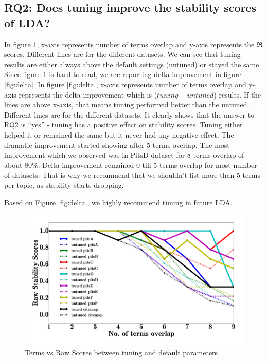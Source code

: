 \documentclass[10pt,conference]{IEEEtran}
\theoremstyle{break}
\begin{document}
\subsection{\textbf{RQ2: Does tuning improve the stability scores of LDA?}}

In figure \ref{fig:raw}, x-axis represents number of terms overlap and y-axis represents the $\Re$ scores. Different lines are for the different datasets. We can see that tuning results are either always above the default settings (untuned) or stayed the same. Since figure \ref{fig:raw} is hard to read, we are reporting delta improvement in figure \ref{fig:delta}. In figure \ref{fig:delta}, x-axis represents number of terms overlap and y-axis represents the delta improvement which is ($tuning - untuned$) results. If the lines are above x-axis, that means tuning performed better than the untuned. Different lines are for the different datasets. It clearly shows that the answer to RQ2 is “yes” - tuning has a positive effect on stability scores. Tuning either helped it or remained the same but it never had any negative effect. The dramatic improvement started showing after 5 terms overlap. The most improvement which we observed was in PitsD dataset for 8 terms overlap of about 80\%. Delta improvement remained 0 till 5 terms overlap for most number of datasets. That is why we recommend that we shouldn't list more than 5 terms per topic, as stability starts dropping.

\begin{lesson}
Based on Figure \ref{fig:delta}, we highly recommend tuning in future LDA.
\end{lesson}

\begin{center}
\begin{figure}[!htbp]
  \includegraphics[width=\linewidth]{./fig/raw_graph.png}
  \caption{Terms vs Raw Scores between tuning and default parameters}
  \label{fig:raw}
\end{figure}
\end{center}
\end{document}
